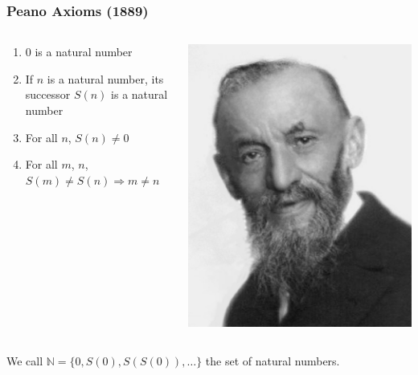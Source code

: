 \documentclass{beamer}
\def\N{\mathbb{N}}
\begin{document}
\begin{frame}
    \frametitle{Peano Axioms (1889)}
    \begin{columns}
        \begin{column}{.75\textwidth}
            \begin{enumerate}
                \item 0 is a natural number
                \item If $n$ is a natural number, its successor $S(n)$ is a natural number
                \item For all $n$, $S(n) \neq 0$
                \item For all $m$, $n$, $S(m) \neq S(n) \Rightarrow m \neq n$
            \end{enumerate}
        \end{column}
        \begin{column}{.25\textwidth}
            \includegraphics[height=.25\textheight]{images/Giuseppe_Peano.jpg}
            \vfill
        \end{column}
    \end{columns}
    \vspace{2.5em}
    \pause[2]
    We call $\N = \{ 0, S(0), S(S(0)), \dots \}$ the set of natural numbers.
\end{frame}
\end{document}
